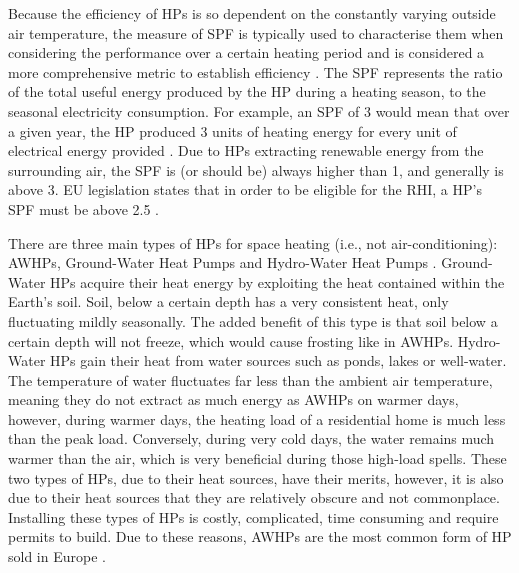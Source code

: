 Because the efficiency of \acp{HP} is so dependent on the constantly varying outside air temperature, the measure of \ac{SPF} is typically used to characterise them when considering the performance over a certain heating period and is considered a more comprehensive metric to establish \HP efficiency \cite{seai_heat_2020,nowak_2018}. The \ac{SPF} represents the ratio of the total useful energy produced by the \ac{HP} during a heating season, to the seasonal electricity consumption. For example, an \ac{SPF} of 3 would mean that over a given year, the \ac{HP} produced 3 units of heating energy for every unit of electrical energy provided \cite{seai_heat_2020}. Due to \acp{HP} extracting renewable energy from the surrounding air, the \ac{SPF} is (or should be) always higher than 1, and generally is above 3. EU legislation states that in order to be eligible for the \ac{RHI}, a \ac{HP}'s \ac{SPF} must be above 2.5 \cite{eu-114-2014}. 

There are three main types of \acp{HP} for space heating (i.e., not air-conditioning): \acp{AWHP}, Ground-Water Heat Pumps and Hydro-Water Heat Pumps \cite{omer_2008,Ochsner_2007}. Ground-Water \acp{HP} acquire their heat energy by exploiting the heat contained within the Earth's soil. Soil, below a certain depth has a very consistent heat, only fluctuating mildly seasonally. The added benefit of this type is that soil below a certain depth will not freeze, which would cause frosting like in \acp{AWHP}. Hydro-Water \acp{HP} gain their heat from water sources such as ponds, lakes or well-water. The temperature of water fluctuates far less than the ambient air temperature, meaning they do not extract as much energy as \acp{AWHP} on warmer days, however, during warmer days, the heating load of a residential home is much less than the peak load. Conversely, during very cold days, the water remains much warmer than the air, which is very beneficial during those high-load spells. These two types of \acp{HP}, due to their heat sources, have their merits, however, it is also due to their heat sources that they are relatively obscure and not commonplace. Installing these types of \acp{HP} is costly, complicated, time consuming and require permits to build. Due to these reasons, \acp{AWHP} are the most common form of \ac{HP} sold in Europe \cite{ehpa_2015}.  

